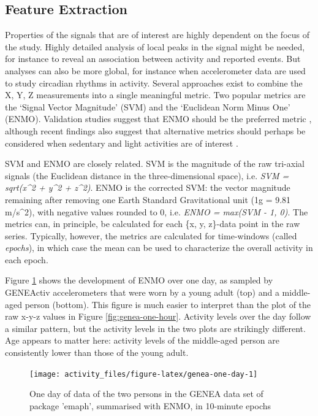 \documentclass[]{book}
\begin{document}
\subsection{Feature Extraction}\label{feature-extraction}

 

Properties of the signals that are of interest are highly dependent on
the focus of the study. Highly detailed analysis of local peaks in the
signal might be needed, for instance to reveal an association between
activity and reported events. But analyses can also be more global, for
instance when accelerometer data are used to study circadian rhythms in
activity. Several approaches exist to combine the X, Y, Z measurements
into a single meaningful metric. Two popular metrics are the `Signal
Vector Magnitude' (SVM) and the `Euclidean Norm Minus One' (ENMO).
Validation studies suggest that ENMO should be the preferred metric
\citep{VanHees2014, VanHees2015}, although recent findings also suggest
that alternative metrics should perhaps be considered when sedentary and
light activities are of interest \citep{Bai2016}.

SVM and ENMO are closely related. SVM is the magnitude of the raw
tri-axial signals (the Euclidean distance in the three-dimensional
space), i.e. \emph{SVM = sqrt(x\^{}2 + y\^{}2 + z\^{}2)}. ENMO is the
corrected SVM: the vector magnitude remaining after removing one Earth
Standard Gravitational unit (1g = 9.81 m/s\^{}2), with negative values
rounded to 0, i.e. \emph{ENMO = max(SVM - 1, 0)}. The metrics can, in
principle, be calculated for each \{x, y, z\}-data point in the raw
series. Typically, however, the metrics are calculated for time-windows
(called \emph{epochs}), in which case the mean can be used to
characterize the overall activity in each epoch.

Figure \ref{fig:genea-one-day} shows the development of ENMO over one
day, as sampled by GENEActiv accelerometers that were worn by a young
adult (top) and a middle-aged person (bottom). This figure is much
easier to interpret than the plot of the raw x-y-z values in Figure
\ref{fig:genea-one-hour}. Activity levels over the day follow a similar
pattern, but the activity levels in the two plots are strikingly
different. Age appears to matter here: activity levels of the
middle-aged person are consistently lower than those of the young adult.

\begin{figure}

{\centering \texttt{[image: activity\_files/figure-latex/genea-one-day-1]} 

}

\caption{One day of data of the two persons in the GENEA data set of package 'emaph', summarised with ENMO, in 10-minute epochs}\label{fig:genea-one-day}
\end{figure}
\end{document}
